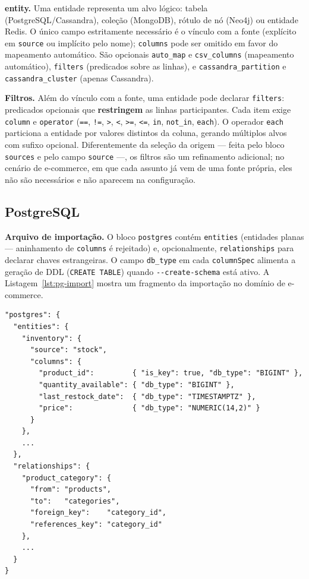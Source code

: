 \textbf{entity.} Uma entidade representa um alvo lógico: tabela (PostgreSQL/Cassandra),
coleção (MongoDB), rótulo de nó (Neo4j) ou entidade Redis. O único campo estritamente
necessário é o vínculo com a fonte (explícito em \texttt{source} ou implícito pelo nome);
\texttt{columns} pode ser omitido em favor do mapeamento automático. São opcionais
\texttt{auto\_map} e \texttt{csv\_columns} (mapeamento automático), \texttt{filters}
(predicados sobre as linhas), e \texttt{cassandra\_partition} e
\texttt{cassandra\_cluster} (apenas Cassandra).

\textbf{Filtros.} Além do vínculo com a fonte, uma entidade pode declarar
\texttt{filters}: predicados opcionais que \textbf{restringem} as linhas participantes.
Cada item exige \texttt{column} e \texttt{operator} (\texttt{==}, \texttt{!=},
\texttt{>}, \texttt{<}, \texttt{>=}, \texttt{<=}, \texttt{in}, \texttt{not\_in},
\texttt{each}). O operador \texttt{each} particiona a entidade por valores distintos da
coluna, gerando múltiplos alvos com sufixo opcional. Diferentemente da seleção da origem
--- feita pelo bloco \texttt{sources} e pelo campo \texttt{source} ---, os filtros são um
refinamento adicional; no cenário de e-commerce, em que cada assunto já vem de uma fonte
própria, eles não são necessários e não aparecem na configuração.

\subsection{PostgreSQL}

\textbf{Arquivo de importação.} O bloco \texttt{postgres} contém \texttt{entities}
(entidades planas --- aninhamento de \texttt{columns} é rejeitado) e, opcionalmente,
\texttt{relationships} para declarar chaves estrangeiras. O campo \texttt{db\_type} em
cada \texttt{columnSpec} alimenta a geração de DDL (\texttt{CREATE TABLE}) quando
\texttt{-{}-create-schema} está ativo. A Listagem~\ref{lst:pg-import} mostra um fragmento
da importação no domínio de e-commerce.

\begin{lstlisting}[style=jsonstyle,caption={Fragmento de importação PostgreSQL (e-commerce).},label={lst:pg-import}]
"postgres": {
  "entities": {
    "inventory": {
      "source": "stock",
      "columns": {
        "product_id":         { "is_key": true, "db_type": "BIGINT" },
        "quantity_available": { "db_type": "BIGINT" },
        "last_restock_date":  { "db_type": "TIMESTAMPTZ" },
        "price":              { "db_type": "NUMERIC(14,2)" }
      }
    },
    ...
  },
  "relationships": {
    "product_category": {
      "from": "products",
      "to":   "categories",
      "foreign_key":    "category_id",
      "references_key": "category_id"
    },
    ...
  }
}
\end{lstlisting}

